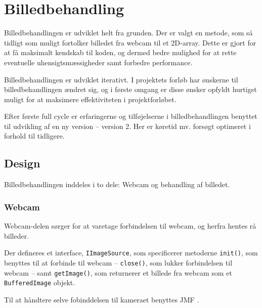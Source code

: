 \chapter{Billedbehandling}\label{cha:ip}
Billedbehandlingen er udviklet helt fra grunden. Der er valgt en metode, som så tidligt som muligt fortolker billedet fra webcam til et 2D-array. Dette er gjort for at få maksimalt kendskab til koden, og dermed bedre mulighed for at rette eventuelle uhensigtsmæssigheder samt forbedre performance.

Billedbehandlingen er udviklet iterativt. I projektets forløb har ønskerne til billedbehandlingen ændret sig, og i første omgang er disse ønsker opfyldt hurtigst muligt for at maksimere effektiviteten i projektforløbet.

Efter første full cycle er erfaringerne og tilføjelserne i billedbehandlingen benyttet til udvikling af en ny version -- version 2. Her er køretid mv. forsøgt optimeret i forhold til tidligere.

\section{Design}
Billedbehandlingen inddeles i to dele: Webcam og behandling af billedet.

\subsection{Webcam}
Webcam-delen sørger for at varetage forbindelsen til webcam, og herfra hentes rå billeder.

Der defineres et interface, \texttt{IImageSource}, som specificerer metoderne \texttt{init()}, som benyttes til at forbinde til webcam -- \texttt{close()}, som lukker forbindelsen til webcam -- samt \texttt{getImage()}, som returnerer et billede fra webcam som et \texttt{BufferedImage} objekt.

Til at håndtere selve fobinddelsen til kameraet benyttes JMF .

\begin{comment}
Opbygning
	Webcam -> behandling
	JMF
\end{comment}

